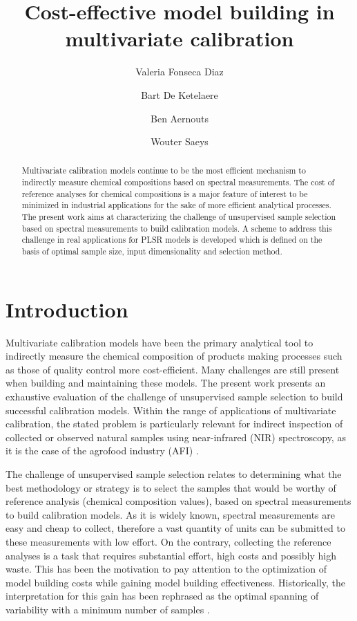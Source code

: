 \documentclass[journal=ancham,manuscript=article]{achemso}
\author{Valeria Fonseca Diaz}
\author{Bart De Ketelaere}
\author{Ben Aernouts}
\author{Wouter Saeys}
\affiliation[KU Leuven]
{KU Leuven, Kasteelpark
Arenberg 30, Leuven, Belgium}
\title[An \textsf{achemso} demo]
  {Cost-effective model building in multivariate calibration}
\begin{document}
\begin{abstract}
Multivariate calibration models continue to be the most efficient mechanism to indirectly measure chemical compositions based on spectral measurements. The cost of reference analyses for chemical compositions is a major feature of interest to be minimized in industrial applications for the sake of more efficient analytical processes. The present work aims at characterizing the challenge of unsupervised sample selection based on spectral measurements to build calibration models. A scheme to address this challenge in real applications for PLSR models is developed which is defined on the basis of optimal sample size, input dimensionality and selection method.
\end{abstract}%


\section{Introduction}\label{introduction}

Multivariate calibration models have been the primary analytical tool to indirectly measure the chemical composition of products making processes such as those of quality control more cost-efficient. Many challenges are still present when building and maintaining these models. The present work presents an exhaustive evaluation of the challenge of unsupervised sample selection to build successful calibration models. Within the range of applications of multivariate calibration, the stated problem is particularly relevant for indirect inspection of collected or observed natural samples using near-infrared (NIR) spectroscopy, as it is the case of the agrofood industry (AFI) \cite{Au2020,Diaz-Olivares2020, Saeys2005, Bobelyn2010}.  

The challenge of unsupervised sample selection relates to determining what the best methodology or strategy is to select the samples that would be worthy of reference analysis (chemical composition values), based on spectral measurements to build calibration models. As it is widely known, spectral measurements are easy and cheap to collect, therefore a vast quantity of units can be submitted to these measurements with low effort. On the contrary, collecting the reference analyses is a task that requires substantial effort, high costs and possibly high waste. This has been the motivation to pay attention to the optimization of model building costs while gaining model building effectiveness. Historically, the interpretation for this gain has been rephrased as the optimal spanning of variability with a minimum number of samples \cite{Naes1990, Saeys2019,Kennard1969}.
\end{document}
